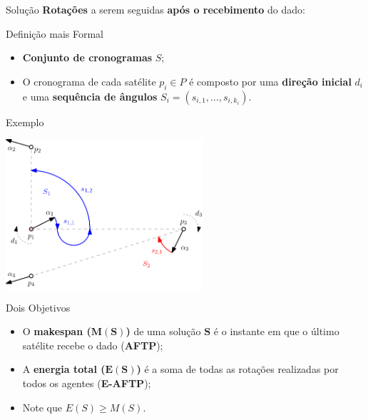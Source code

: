 \begin{frame}{Solução}
  \centering
  \textbf{Rotações} a serem seguidas \textbf{após o recebimento} do dado:

  \pause

  \bigskip
  \begin{minipage}{\linewidth}
    \centering
    \colorbox{white}{}
  \end{minipage}
\end{frame}

\begin{frame}{Definição mais Formal}
  \begin{itemize}[<+->]
    \item \textbf{Conjunto de cronogramas} $S$;

    \item O cronograma de cada satélite $p_i\in P$ é composto por uma \textbf{direção inicial} $d_i$ \pause e uma \textbf{sequência de ângulos} $S_i=(s_{i,1}, \dots, s_{i,k_i})$.
  \end{itemize}
\end{frame}

\begin{frame}{Exemplo}
  \begin{minipage}{\linewidth}
    \centering
    \colorbox{white}{\includegraphics[height=5.5cm]{AFTP/solution.png}}
  \end{minipage}
\end{frame}

\begin{frame}{Dois Objetivos}
  \begin{itemize}[<+->]
    \item O \textbf{makespan ($\mathbf{M(S)}$)} de uma solução $\mathbf{S}$ é o instante em que o último satélite recebe o dado (\textbf{AFTP});
    
    \item A \textbf{energia total ($\mathbf{E(S)}$)} é a soma de todas as rotações realizadas por todos os agentes (\textbf{E-AFTP});
    \bigbreak

    \item Note que $E(S) \ge M(S)$.
  \end{itemize}
\end{frame}

